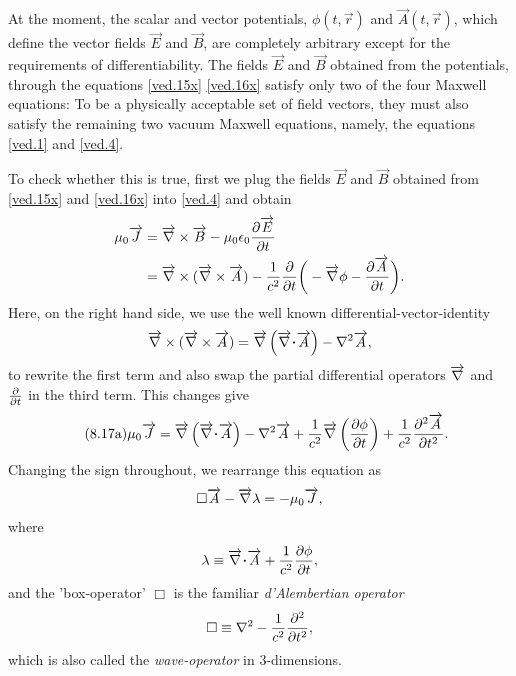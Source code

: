 At the moment, the scalar and  vector potentials, $\phi 
(t,\vec{r})$ and $\vec{A}(t,\vec{r})$, which define
the vector fields $\vec{E}$ and $\vec{B}$,  are completely 
arbitrary except for the  requirements of differentiability. 
The fields $\vec{E}$ and $\vec{B}$ obtained from  
the potentials, through the equations 
\eqref{ved.15x} \eqref{ved.16x} satisfy only two of the four
Maxwell equations: To be a physically acceptable set of 
field vectors,  they must also satisfy  
the remaining two vacuum Maxwell equations, namely, the 
equations \eqref{ved.1} and \eqref{ved.4}.  

To check whether this is true, first we plug the fields 
$\vec{E}$ and $\vec{B}$ obtained from \eqref{ved.15x} and 
\eqref{ved.16x} into \eqref{ved.4} and obtain
\begin{align*}
\mu_0 \overrightarrow{J} &={\overrightarrow{\nabla} } \times \overrightarrow{B}- \mu_0\epsilon_0 \frac{{\partial} 
\overrightarrow{E}}{{\partial} t}\\
&={\overrightarrow{\nabla} } \times({\overrightarrow{\nabla} } \times \overrightarrow{A}) - \frac{1}{c^2} 
\frac{{\partial} }{{\partial} t}\bigg(-{\overrightarrow{\nabla} } \phi- \frac{{\partial} \overrightarrow{A}} 
{{\partial} t}\bigg).
\end{align*}
Here, on the right hand side, we use the well known 
differential-vector-identity 
\begin{align*}
 \vnab \cross(\vnab\cross \vec{A})=\vnab \left(\vnab \dotp 
\vec{A} \right)-\nabla^2\vec{A}, 
\end{align*}
to rewrite the first term and also  swap the partial 
differential operators ${\overrightarrow{\nabla} }$ and $\frac{{\partial}{}}{{\partial}{t}}$ in the third 
term. This changes give  
\begin{align}\tag{8.17a}
\mu_0 \vec{J}
&= \vnab \left(\vnab \dotp \vec{A} \right)
-\nabla^2\vec{A} +\frac{1}{c^2}\vnab \left(
\frac{\dow\phi}{\dow t}\right)+\frac{1}{c^2}
\frac{\dow^2\vec{A}}{\dow t^2}.
\end{align}
Changing the sign throughout, we  rearrange this  
equation as
\begin{align}\label{ved.17x}
\Box\overrightarrow{A}- {\overrightarrow{\nabla} } {\lambda}= -\mu_0\overrightarrow{J},
\end{align}
where
\begin{align}\label{ved.18x}
\lambda \equiv \vnab \dotp \vec{A}+\frac{1}{c^2}
\frac{\dow\phi}{\dow t},
\end{align}
and the 'box-operator' $\Box$  is the familiar 
\textsl{d'Alembertian operator}
\begin{align}\label{ved.19x}
\Box \equiv \nabla^2 -\frac{1}{c^2}\frac{{\partial}^2}{{\partial} t^2},
\end{align}
which is also called the \textsl{wave-operator} in 
3-dimensions. 

